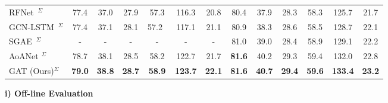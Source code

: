 \documentclass[review]{elsarticle}
\begin{document}
\begin{table*}[htb]
\begin{center}
{\begin{tabular}{l | c c c c c c | c c c c c c}
        RFNet~\cite{jiang2018recurrent}$^{\Sigma}$  & 77.4                                            & 37.0                                              & 27.9          & 57.3           & 116.3          & 20.8          & 80.4          & 37.9          & 28.3          & 58.3          & 125.7          & 21.7          \\
        GCN-LSTM~\cite{yao2018exploring}$^{\Sigma}$ & 77.4                                            & 37.1                                              & 28.1          & 57.2~          & 117.1          & 21.1          & 80.9          & 38.3          & 28.6          & 58.5          & 128.7          & 22.1          \\
        SGAE~\cite{yang2019auto}$^{\Sigma}$         & -                                               & -                                                 & -             & -              & -              & -             & 81.0          & 39.0          & 28.4          & 58.9          & 129.1          & 22.2          \\
        AoANet \cite{huang2019attention}$^{\Sigma}$ & 78.7                                            & 38.1                                              & 28.5          & 58.2           & 122.7          & 21.7          & \textbf{81.6} & 40.2          & 29.3          & 59.4          & 132.0          & 22.8          \\
        \hline
        GAT (Ours)$^{\Sigma}$                       & \textbf{79.0}                                   & \textbf{38.8}                                     & \textbf{28.7} & \textbf{58.9 } & \textbf{123.7} & \textbf{22.1} & \textbf{81.6} & \textbf{40.7} & \textbf{29.4} & \textbf{59.6} & \textbf{133.4} & \textbf{23.2} \\
        \bottomrule
      \end{tabular}}
  \end{center}
\end{table*}


\textbf{i) Off-line Evaluation}
\end{document}
